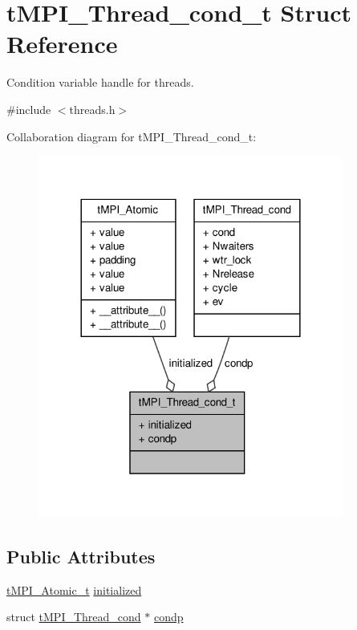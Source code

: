 \hypertarget{structtMPI__Thread__cond__t}{\section{t\-M\-P\-I\-\_\-\-Thread\-\_\-cond\-\_\-t \-Struct \-Reference}
\label{structtMPI__Thread__cond__t}
}


\-Condition variable handle for threads.  




{\ttfamily \#include $<$threads.\-h$>$}



\-Collaboration diagram for t\-M\-P\-I\-\_\-\-Thread\-\_\-cond\-\_\-t\-:
\nopagebreak
\begin{figure}[H]
\begin{center}
\leavevmode
\includegraphics[width=284pt]{structtMPI__Thread__cond__t__coll__graph}
\end{center}
\end{figure}
\subsection*{\-Public \-Attributes}
\begin{DoxyCompactItemize}
\item 
\hyperlink{include_2thread__mpi_2atomic_2gcc_8h_a2c33794dc540e3b07cffc1f81a3fe4b4}{t\-M\-P\-I\-\_\-\-Atomic\-\_\-t} \hyperlink{structtMPI__Thread__cond__t_a157a99c38d7481b3c9faab9aaf7c38e8}{initialized}
\item 
struct \hyperlink{structtMPI__Thread__cond}{t\-M\-P\-I\-\_\-\-Thread\-\_\-cond} $\ast$ \hyperlink{structtMPI__Thread__cond__t_aadcbad165d1f14e7325147ea4b8a2c0c}{condp}
\end{DoxyCompactItemize}



